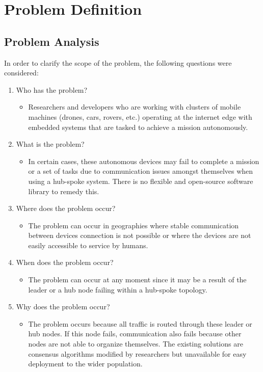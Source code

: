 \section{Problem Definition}
\subsection{Problem Analysis}
In order to clarify the scope of the problem, the following questions were considered:

\begin{enumerate}

    \item Who has the problem?
    \begin{itemize}
        \item Researchers and developers who are working with clusters of mobile machines (drones, cars, rovers, etc.) operating at the internet edge with embedded systems that are tasked to achieve a mission autonomously.
    \end{itemize}
    
    \item What is the problem?
    \begin{itemize}
        \item In certain cases, these autonomous devices may fail to complete a mission or a set of tasks due to communication issues amongst themselves when using a hub-spoke system. There is no flexible and open-source software library to remedy this.
    \end{itemize}
    
    \item Where does the problem occur?
    \begin{itemize}
        \item The problem can occur in geographies where stable communication between devices connection is not possible or where the devices are not easily accessible to service by humans.
    \end{itemize}
    
    \item When does the problem occur?
    \begin{itemize}
        \item The problem can occur at any moment since it may be a result of the leader or a hub node failing within a hub-spoke topology.
    \end{itemize}
    
    \item Why does the problem occur?
    \begin{itemize}
        \item The problem occurs because all traffic is routed through these leader or hub nodes. If this node fails, communication also fails because other nodes are not able to organize themselves. The existing solutions are consensus algorithms modified by researchers but unavailable for easy deployment to the wider population.
    \end{itemize}
\end{enumerate}

